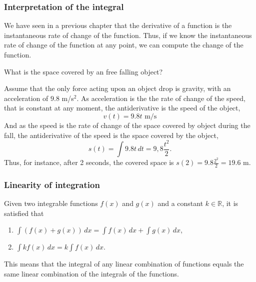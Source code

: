 \begin{frame}
\frametitle{Interpretation of the integral}
We have seen in a previous chapter that the derivative of a function is the instantaneous rate of change of the function. 
Thus, if we know the instantaneous rate of change of the function at any point, we can compute the change of the function.

 What is the space covered by an free falling object?

Assume that the only force acting upon an object drop is gravity, with an acceleration of $9.8$ m/s$^2$. 
As acceleration is the the rate of change of the speed, that is constant at any moment, the antiderivative is the speed of the object, 
\[
v(t) = 9.8t  \mbox{ m/s}
\] 
And as the speed is the rate of change of the space covered by object during the fall, the antiderivative of the speed is the space covered by the object, 
\[
s(t) = \int 9.8t\, dt = 9,8\frac{t^2}{2}.
\]
Thus, for instance, after 2 seconds, the covered space is $s(2) = 9.8\frac{2^2}{2} = 19.6$ m.
\end{frame}


\begin{frame}
\frametitle{Linearity of integration}
Given two integrable functions $f(x)$ and $g(x)$ and a constant $k \in \mathbb{R}$, it is satisfied that
\begin{enumerate}
\item $\int{(f(x)+g(x))}\,dx=\int{f(x)}\,dx+\int{g(x)}\,dx$,

\item $\int{kf(x)}\,dx=k\int{f(x)}\,dx$.
\end{enumerate}

This means that the integral of any linear combination of functions equals the same linear combination of the integrals of the functions.
\end{frame}


